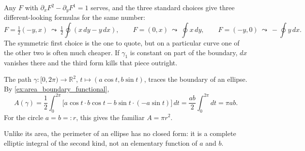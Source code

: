 \begin{remark}
Any $F$ with $\partial_xF^2 - \partial_yF^1 = 1$ serves, and the three standard choices give
three different-looking formulas for the same number:
\[F = \tfrac12(-y,x) \ \leadsto\ \tfrac12\oint (x\,dy - y\,dx), \qquad
  F = (0,x) \ \leadsto\ \oint x\,dy, \qquad
  F = (-y,0) \ \leadsto\ -\oint y\,dx.\]
The symmetric first choice is the one to quote, but on a particular curve one of the other two is
often much cheaper. If $\gamma_1$ is constant on part of the boundary, $dx$ vanishes there and the
third form kills that piece outright.
\end{remark}

\begin{example}[Ellipse]
\label{ex:area_ellipse}
The path $\gamma : [0,2\pi) \to \mathbb{R}^2$, $t \mapsto (a\cos t,b\sin t)$, traces the
boundary of an ellipse. By \cref{ex:area_boundary_functional},
\[
A(\gamma) = \frac12\int_0^{2\pi} \big[a\cos t\cdot b\cos t - b\sin t\cdot(-a\sin t)\big]\,dt
  = \frac{ab}{2}\int_0^{2\pi} dt = \pi ab.
\]
For the circle $a=b=:r$, this gives the familiar $A = \pi r^2$.
\end{example}

\begin{remark}
Unlike its area, the perimeter of an ellipse has no closed form: it is a complete elliptic
integral of the second kind, not an elementary function of $a$ and $b$.
\end{remark}




